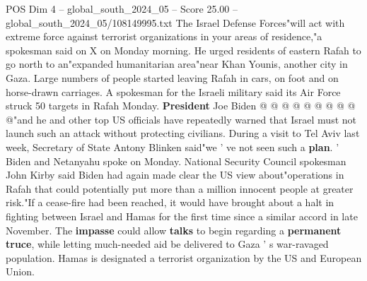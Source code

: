 \begin{textsample}{POS Dim 4 – global\_south\_2024\_05 – Score 25.00 – global\_south\_2024\_05/108149995.txt}
The Israel Defense Forces"will act with extreme force against terrorist organizations in your areas of residence,"a spokesman said on X on Monday morning.
He urged residents of eastern Rafah to go north to an"expanded humanitarian area"near Khan Younis, another city in Gaza.
Large numbers of people started leaving Rafah in cars, on foot and on horse-drawn carriages.
A spokesman for the Israeli military said its Air Force struck 50 targets in Rafah Monday. \textbf{President} Joe Biden @ @ @ @ @ @ @ @ @ @"and he and other top US officials have repeatedly warned that Israel must not launch such an attack without protecting civilians.
During a visit to Tel Aviv last week, Secretary of State Antony Blinken said"we ' ve not seen such a \textbf{plan}. ' Biden and Netanyahu spoke on Monday.
National Security Council spokesman John Kirby said Biden had again made clear the US view about"operations in Rafah that could potentially put more than a million innocent people at greater risk."If a cease-fire had been reached, it would have brought about a halt in fighting between Israel and Hamas for the first time since a similar accord in late November.
The \textbf{impasse} could allow \textbf{talks} to begin regarding a \textbf{permanent} \textbf{truce}, while letting much-needed aid be delivered to Gaza ' s war-ravaged population.
Hamas is designated a terrorist organization by the US and European Union.

\end{textsample}
